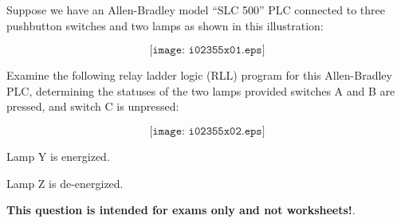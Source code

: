 

Suppose we have an Allen-Bradley model ``SLC 500'' PLC connected to three pushbutton switches and two lamps as shown in this illustration:

$$\texttt{[image: i02355x01.eps]}$$

Examine the following relay ladder logic (RLL) program for this Allen-Bradley PLC, determining the statuses of the two lamps provided switches A and B are pressed, and switch C is unpressed:

$$\texttt{[image: i02355x02.eps]}$$







Lamp Y is energized.

\vskip 10pt

Lamp Z is de-energized.







{\bf This question is intended for exams only and not worksheets!}.



